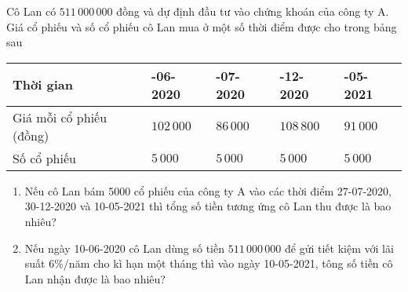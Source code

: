 	\begin{vd}
	Cô Lan có $511\,000\,000$ đồng và dự định đầu tư vào chứng khoán của công ty A. Giá cổ phiếu và số cổ phiếu cô Lan mua ở một số thời điểm được cho trong bảng sau
	\begin{center}
	\begin{tabular}{|p{}|>{\centering\arraybackslash}p{}|>{\centering\arraybackslash}p{}|>{\centering\arraybackslash}p{}|>{\centering\arraybackslash}p{}|}
	\hline 
	Thời gian & 10-06-2020 & 27-07-2020 & 30-12-2020 & 10-05-2021	 \\ 
	\hline 
	Giá mỗi cổ phiếu (đồng) & $102\,000$ & $86\,000$ & $108\,800$ & $91\,000$ \\ 
	\hline 
	Số cổ phiếu & $5\,000$ & $5\,000$ & $5\,000$ & $5\,000$ \\ 
	\hline 
	\end{tabular} 
	\end{center}
	\begin{enumerate}
	\item Nếu cô Lan bám 5000 cổ phiếu của công ty A vào các thời điểm 27-07-2020, 30-12-2020 và 10-05-2021 thì tổng số tiền tương ứng cô Lan thu được là bao nhiêu?
	\item Nếu ngày 10-06-2020 cô Lan dùng số tiền $511\,000\,000$ để gửi tiết kiệm với lãi suất 6\%/năm cho kì hạn một tháng thì vào ngày 10-05-2021, tông số tiền cô Lan nhận được là bao nhiêu?
	\end{enumerate}
	\end{vd}
	
